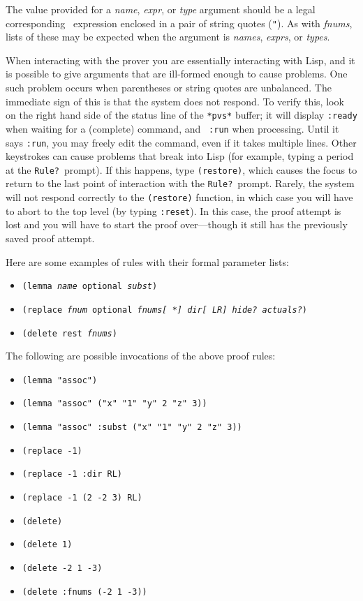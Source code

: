 \documentclass[12pt,twoside]{book}
\def\optl{{\smaller\sc {\smaller\smaller \&}optional}}
\def\rest{{\smaller\sc {\smaller\smaller \&}rest}}
\def\default#1{[\,\texttt{#1}]}
\begin{document}
The value provided for a \emph{name}, \emph{expr}, or \emph{type}
argument should be a legal corresponding \pvs\ expression enclosed in
a pair of string quotes (\texttt{"}).  As with \emph{fnums}, lists of
these may be expected when the argument is \emph{names}, \emph{exprs},
or \emph{types}.

 When interacting with the prover you are
essentially interacting with Lisp, and it is possible to give arguments
that are ill-formed enough to cause problems.  One such problem occurs
when parentheses or string quotes are unbalanced.  The immediate sign of
this is that the system does not respond.  To verify this, look on the
right hand side of the status line of the \texttt{*pvs*} buffer; it will
display \texttt{:ready} when waiting for a (complete) command, and {\tt
:run} when processing.  Until it says \texttt{:run}, you may freely edit
the command, even if it takes multiple lines.  Other keystrokes can
cause problems that break into Lisp (for example, typing a period at the
\texttt{Rule?}\ prompt).  If this happens, type \texttt{(restore)}, which
causes the focus to return to the last point of interaction 
with the \texttt{Rule?}\ prompt.
Rarely, the system will not respond correctly to the \texttt{(restore)}
function, in which case you will have to abort to the top level (by
typing \texttt{:reset}).  In this case, the proof attempt is lost and
you will have to start the proof over---though it still has the
previously saved proof attempt.

Here are some examples of rules with their formal parameter lists:
\begin{itemize}
\item \texttt{(lemma \emph{name} \optl\ \emph{subst})}
\item \texttt{(replace \emph{fnum} \optl\
      \emph{fnums\default{*}} \emph{dir\default{LR}} \emph{hide?} \emph{actuals?})}
\item \texttt{(delete \rest\ \emph{fnums})}
\end{itemize}
The following are possible invocations of the above proof rules:
\begin{itemize}
\item \texttt{(lemma "assoc")}
\item \texttt{(lemma "assoc" ("x" "1" "y" 2 "z" 3))}
\item \texttt{(lemma "assoc" :subst ("x" "1" "y" 2 "z" 3))}
\item \texttt{(replace -1)}
\item \texttt{(replace -1 :dir RL)}
\item \texttt{(replace -1 (2 -2 3) RL)}
\item \texttt{(delete)}
\item \texttt{(delete 1)}
\item \texttt{(delete -2 1 -3)}
\item \texttt{(delete :fnums (-2 1 -3))}
\end{itemize}
\end{document}
